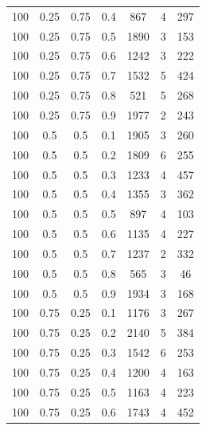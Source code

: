 \documentclass[a4paper,oneside,14pt]{extreport}
\begin{document}
\begin{table}[h]
\begin{center}
\begin{tabular}{|c|c|c|c|c|c|c|}
		100 & 0.25 & 0.75 & 0.4 & 867 & 4 & 297 \\
		100 & 0.25 & 0.75 & 0.5 & 1890 & 3 & 153 \\
		100 & 0.25 & 0.75 & 0.6 & 1242 & 3 & 222 \\
		100 & 0.25 & 0.75 & 0.7 & 1532 & 5 & 424 \\
		100 & 0.25 & 0.75 & 0.8 & 521 & 5 & 268 \\
		100 & 0.25 & 0.75 & 0.9 & 1977 & 2 & 243 \\
		100 & 0.5 & 0.5 & 0.1 & 1905 & 3 & 260 \\
		100 & 0.5 & 0.5 & 0.2 & 1809 & 6 & 255 \\
		100 & 0.5 & 0.5 & 0.3 & 1233 & 4 & 457 \\
		100 & 0.5 & 0.5 & 0.4 & 1355 & 3 & 362 \\
		100 & 0.5 & 0.5 & 0.5 & 897 & 4 & 103 \\
		100 & 0.5 & 0.5 & 0.6 & 1135 & 4 & 227 \\
		100 & 0.5 & 0.5 & 0.7 & 1237 & 2 & 332 \\
		100 & 0.5 & 0.5 & 0.8 & 565 & 3 & 46 \\
		100 & 0.5 & 0.5 & 0.9 & 1934 & 3 & 168 \\
		100 & 0.75 & 0.25 & 0.1 & 1176 & 3 & 267 \\
		100 & 0.75 & 0.25 & 0.2 & 2140 & 5 & 384 \\
		100 & 0.75 & 0.25 & 0.3 & 1542 & 6 & 253 \\
		100 & 0.75 & 0.25 & 0.4 & 1200 & 4 & 163 \\
		100 & 0.75 & 0.25 & 0.5 & 1163 & 4 & 223 \\
		100 & 0.75 & 0.25 & 0.6 & 1743 & 4 & 452 \\
		\hline
		
	\end{tabular}
\end{center}
\end{table}
\end{document}
